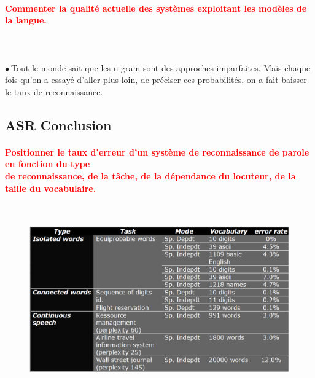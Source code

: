 \documentclass[letterpaper, 12pt]{article}
\newcommand{\red}[1]{
	\textcolor{red}{#1}
}
\newcommand{\point}{$\bullet\ $}
\begin{document}
		\paragraph{\red{Commenter la qualité actuelle des systèmes exploitant les modèles de la langue.}}~\\~\\
			\point Tout le monde sait que les n-gram sont des approches imparfaites. Mais chaque fois qu'on
				a essayé d'aller plus loin, de préciser ces probabilités, on a fait baisser le 
				taux de reconnaissance.
	\subsection{ASR Conclusion}
		\paragraph{\red{Positionner le taux d'erreur d'un système de reconnaissance de parole en fonction du type 
		~\\ \hspace*{0.035cm} de reconnaissance, de la tâche, de la dépendance du locuteur, de la taille du
		vocabulaire.}}~\\
			\begin{figure}[H]
				\centering
				\includegraphics[scale=0.3]{Images/recognition_error}
			\end{figure}\noindent
		
\end{document}

